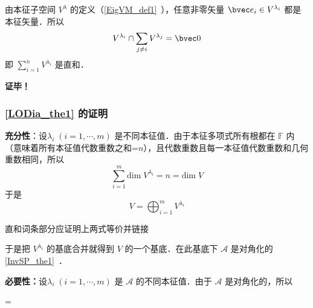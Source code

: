由本征子空间 $V^\lambda$ 的定义（\autoref{EigVM_def1}~），任意非零矢量 $\bvec e_i\in V^{\lambda _i}$ 都是本征矢量．所以
\begin{equation}
V^{\lambda_i}\cap\sum_{j\neq i}V^{\lambda_j}=\bvec 0
\end{equation}
即  $\sum\limits_{i=1}^nV^{\lambda_i}$ 是直和．

\textbf{证毕！}
\subsubsection{\autoref{LODia_the1} 的证明}
\textbf{充分性}：设$\lambda_i\;(i=1,\cdots, m)$ 是不同本征值．由于本征多项式所有根都在 $\mathbb{F}$ 内（意味着所有本征值代数重数之和=$n$），且代数重数且每一本征值代数重数和几何重数相同，所以
\begin{equation}
\sum_{i=1}^m \mathrm{dim}\;V^{\lambda_i}=n=\mathrm{dim}\; V
\end{equation}
于是
\begin{equation}
V=\bigoplus_{i=1}^m V^{\lambda_i}
\end{equation}
\begin{issues}
直和词条部分应证明上两式等价并链接
\end{issues}
于是把 $V^{\lambda_i}$ 的基底合并就得到 $V$ 的一个基底．在此基底下 $\mathcal{A}$ 是对角化的\autoref{InvSP_the1}~．

\textbf{必要性：}设$\lambda_i\;(i=1,\cdots, m)$ 是 $\mathcal A$ 的不同本征值．由于 $\mathcal A$ 是对角化的，所以
\begin{issues}
=
\end{issues}
